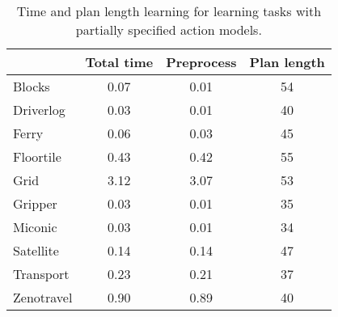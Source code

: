 \documentclass[letterpaper]{article} %
\begin{document}
\begin{table}
\begin{footnotesize}
	\begin{center}
		\begin{tabular}{l|c|c|c|}			
			 & Total time & Preprocess & Plan length  \\
                         \hline
			Blocks & 0.07 & 0.01 & 54  \\
			Driverlog & 0.03 & 0.01 & 40 \\
			Ferry & 0.06 & 0.03 & 45 \\
			Floortile & 0.43 & 0.42 & 55 \\
                        Grid & 3.12 & 3.07 & 53 \\
			Gripper & 0.03 & 0.01 & 35 \\
			Miconic & 0.03 & 0.01 & 34  \\
			Satellite & 0.14 & 0.14 & 47 \\
			Transport & 0.23 & 0.21 & 37 \\
			Zenotravel & 0.90 & 0.89 & 40 \\
		\end{tabular}
	\end{center}
        \end{footnotesize}
	\caption{\small Time and plan length learning for learning tasks with partially specified action models.}
	\label{tab:time_plans_partial}	
\end{table}
\end{document}
